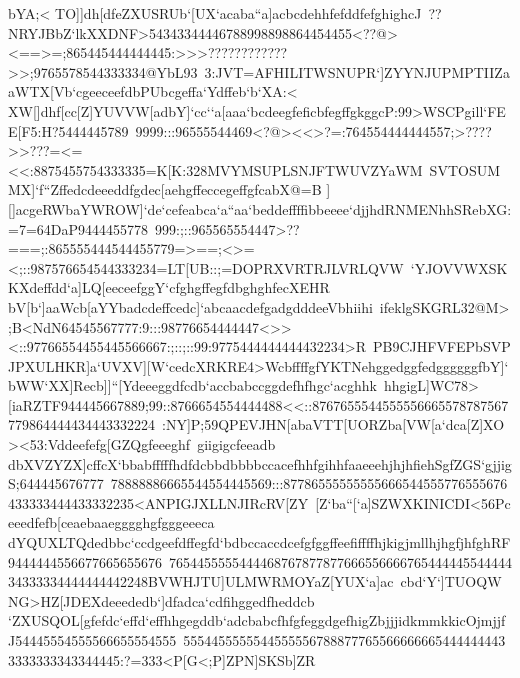 {{{ bYA;<}
 \hbox{TO]]dh[dfeZXUSRUb`[UX`acaba``a]acbcdehhfefddfefghighcJ%
 ??NRYJBbZ`lkXXDNF>54343344446788998898864454455<??@><==>=;865445444444445:>>>????????????>>;9765578544333334@YbL93%
 3:JVT=AFHILITWSNUPR`]ZYYNJUPMPTIIZaaWTX[Vb`cgeeceefdbPUbcgeffa`Ydffeb`b`XA:<}
 \hbox{XW[]dhf[cc[Z]YUVVW[adbY]`cc``a[aaa`bcdeegfeficbfegffgkggcP:99>WSCPgill`FEE[F5:H?5444445789%
 9999:::96555544469<?@><<>?=:764554444444557;>????>>???=<=<<:8875455754333335=K[K:328MVYMSUPLSNJFTWUVZYaWM%
 SVTOSUMMX]`f``Zffedcdeeeddfgdec[aehgffeccegeffgfcabX@=B}
 \hbox{][]acgeRWbaYWROW]`de`cefeabca`a``aa`beddeffffibbeeee`djjhdRNMENhhSRebXG:=7=64DaP9444455778%
 999:;::965565554447>??===;:865555444544455779=>==;<>=<;::987576654544333234=LT[UB::;=DOPRXVRTRJLVRLQVW%
 `YJOVVWXSKKXdeffdd`a]LQ[eeceefggY`cfghgffegfdbghghfecXEHR}
 \hbox{bV[b`]aaWcb[aYYbadcdeffcedc]`abcaacdefgadgdddeeVbhiihi%
 ifeklgSKGRL32@M>;B<NdN64545567777:9:::98776654444447<>><::97766554455445566667:;::;::99:9775444444444432234>R%
 PB9CJHFVFEPbSVPJPXULHKR]a`UVXV][W`cedcXRKRE4>WcbffffgfYKTNehggedggfedggggggfbY]`}
 \hbox{bWW`XX]Recb]]``[Ydeeeggdfcdb`accbabccggdefhfhgc`acghhk%
 hhgigL]WC78>[iaRZTF944445667889;99::8766654554444488<<::8767655544555556665578787567779864444434443332224%
 :NY]P;59QPEVJHN[abaVTT[UORZba[VW[a`dca[Z]XO><53:Vddeefefg[GZQgfeeeghf%
 giigigcfeeadb}
 \hbox{dbXVZYZX]cffcX`bbabfffffhdfdcbbdbbbbccacefhhfgihhfaaeeehjhjhfiehSgfZGS`gjjigS;644445676777%
 78888886665544554445569:::87786555555555666544555776555676433333444433332235<ANPIGJXLLNJIRcRV[ZY%
 [Z`ba``[`a]SZWXKINICDI<56Pceeedfefb[ceaebaaegggghgfgggeeeca}
 \hbox{dYQUXLTQdedbbc`ccdgeefdffegfd`bdbccaccdcefgfggffeefiffffhjkigjmllhjhgfjhfghRF9444444556677665655676%
 765445555544446876787787766655666676544444554444434333334444444442248BVWHJTU]ULMWRMOYaZ[YUX`a]ac%
 cbd`Y`]TUOQWNG>HZ[JDEXdeeededb`]dfadca`cdfihggedfheddcb}
 \hbox{`ZXUSQOL[gfefdc`effd`effhhgegddb`adcbabcfhfgfeggdgefhigZbjjjidkmmkkicOjmjjfJ54445554555566655554555%
 55544555555445555567888777655666666654444444433333333343344445:?=333<P[G<;P]ZPN]SKSb]ZR%
}}}
